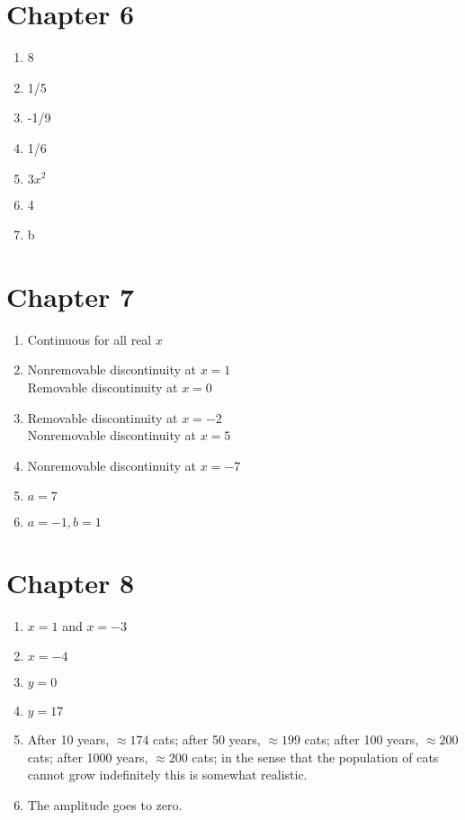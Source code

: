 \section*{Chapter 6}
\twocol
\begin{enumerate}
    \item 8
    \item 1/5
    \item -1/9
    \item 1/6
    \item $3x^2$
    \item 4
    \item b
\end{enumerate}
\endtwocol

\section*{Chapter 7}
\twocol
\begin{enumerate}
    \item Continuous for all real $x$
    \item Nonremovable discontinuity at $x=1$\\Removable discontinuity at $x=0$
    \item Removable discontinuity at $x=-2$\\Nonremovable discontinuity at $x=5$
    \item Nonremovable discontinuity at $x=-7$
    \item $a=7$
    \item $a=-1,b=1$
\end{enumerate}
\endtwocol

\section*{Chapter 8}
\twocol
\begin{enumerate}
    \item $x = 1$ and $x = -3$
    \item $x = -4$
    \item $y=0$
    \item $y=17$
    \item After 10 years, $\approx 174$ cats; after 50 years, $\approx 199$ cats; after 100 years, $\approx 200$ cats; after 1000 years, $\approx 200$ cats; in the sense that the population of cats cannot grow indefinitely this is somewhat realistic.
    \item The amplitude goes to zero. 
\end{enumerate}
\endtwocol

